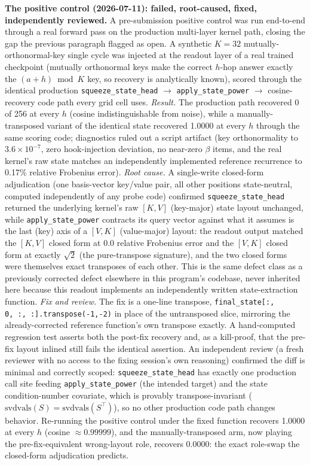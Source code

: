\documentclass{article} %
\begin{document}
\textbf{The positive control (2026-07-11): failed, root-caused, fixed,
independently reviewed.} A pre-submission positive control was run
end-to-end through a real forward pass on the production multi-layer
kernel path, closing the gap the previous paragraph flagged as open. A
synthetic $K{=}32$ mutually-orthonormal-key single cycle was injected at
the readout layer of a real trained checkpoint (mutually orthonormal keys
make the correct $h$-hop answer exactly the $(a{+}h) \bmod K$ key, so
recovery is analytically known), scored through the identical
production \texttt{squeeze\_state\_head} $\to$ \texttt{apply\_state\_power}
$\to$ cosine-recovery code path every grid cell uses.
\emph{Result.} The production path recovered 0 of 256 at every $h$
(cosine indistinguishable from noise), while a manually-transposed variant
of the identical state recovered 1.0000 at every $h$ through the same
scoring code; diagnostics ruled out a script artifact (key orthonormality
to $3.6{\times}10^{-7}$, zero hook-injection deviation, no near-zero
$\beta$ items, and the real kernel's raw state matches an independently
implemented reference recurrence to 0.17\% relative Frobenius error).
\emph{Root cause.} A single-write closed-form adjudication (one basis-vector
key/value pair, all other positions state-neutral, computed independently
of any probe code) confirmed \texttt{squeeze\_state\_head} returned the
underlying kernel's raw $[K,V]$ (key-major) state layout unchanged, while
\texttt{apply\_state\_power} contracts its query vector against what it
assumes is the last (key) axis of a $[V,K]$ (value-major) layout: the
readout output matched the $[K,V]$ closed form at 0.0 relative Frobenius
error and the $[V,K]$ closed form at exactly $\sqrt{2}$ (the pure-transpose
signature), and the two closed forms were themselves exact transposes of
each other. This is the same defect class as a previously corrected
defect elsewhere in this program's codebase, never inherited here because
this readout implements an independently written state-extraction function.
\emph{Fix and review.} The fix is a one-line transpose,
\texttt{final\_state[:,\,0,\,:,\,:].transpose(-1,-2)} in place of the
untransposed slice, mirroring the already-corrected reference function's
own transpose exactly. A hand-computed regression test asserts both the
post-fix recovery and, as a kill-proof, that the pre-fix layout inlined
still fails the identical assertion. An independent review (a fresh
reviewer with no access to the fixing session's own reasoning) confirmed
the diff is minimal and correctly scoped: \texttt{squeeze\_state\_head} has
exactly one production call site feeding \texttt{apply\_state\_power} (the
intended target) and the state condition-number covariate, which is
provably transpose-invariant ($\mathrm{svdvals}(S) = \mathrm{svdvals}(S^\top)$),
so no other production code path changes behavior. Re-running the positive
control under the fixed function recovers 1.0000 at every $h$
(cosine $\approx 0.99999$), and the manually-transposed arm, now playing
the pre-fix-equivalent wrong-layout role, recovers 0.0000: the exact
role-swap the closed-form adjudication predicts.
\end{document}
